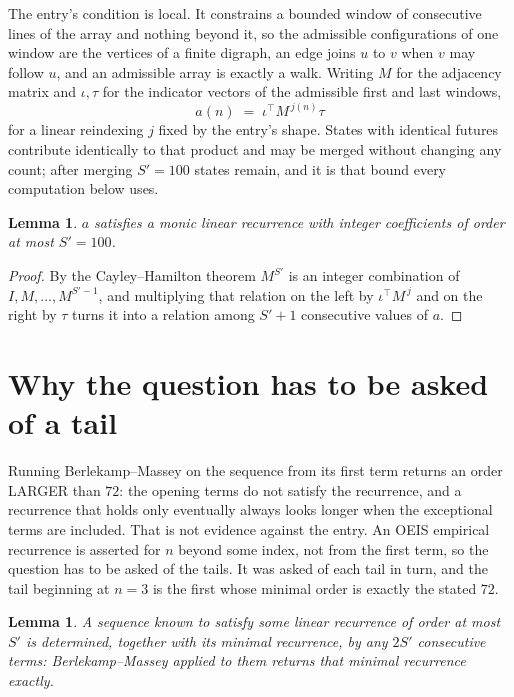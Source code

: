 \documentclass[11pt,a4paper]{article}
\theoremstyle{plain}
\newtheorem{lemma}[theorem]{Lemma}
\theoremstyle{definition}
\begin{document}
The entry's condition is local. It constrains a bounded window of consecutive lines of the
array and nothing beyond it, so the admissible configurations of one window are the vertices of
a finite digraph, an edge joins $u$ to $v$ when $v$ may follow $u$, and an admissible array is
exactly a walk. Writing $M$ for the adjacency matrix and $\iota,\tau$ for the indicator vectors
of the admissible first and last windows,
\[
a(n)\;=\;\iota^{\!\top}M^{\,j(n)}\tau
\]
for a linear reindexing $j$ fixed by the entry's shape. States with identical futures
contribute identically to that product and may be merged without changing any count; after
merging $S'=100$ states remain, and it is that bound every computation below uses.

\begin{lemma}\label{lem:cf}
$a$ satisfies a monic linear recurrence with integer coefficients of order at most $S'=100$.
\end{lemma}

\begin{proof}
By the Cayley--Hamilton theorem $M^{S'}$ is an integer combination of $I,M,\dots,M^{S'-1}$,
and multiplying that relation on the left by $\iota^{\!\top}M^{\,j}$ and on the right by
$\tau$ turns it into a relation among $S'+1$ consecutive values of $a$.
\end{proof}

\section{Why the question has to be asked of a tail}

Running Berlekamp--Massey on the sequence from its first term returns an order LARGER than $72$: the opening terms do not satisfy the recurrence, and a recurrence that holds only eventually always looks longer when the exceptional terms are included. That is not evidence against the entry. An OEIS empirical recurrence is asserted for $n$ beyond some index, not from the first term, so the question has to be asked of the tails. It was asked of each tail in turn, and the tail beginning at $n=3$ is the first whose minimal order is exactly the stated $72$.

\begin{lemma}\label{lem:bm}
A sequence known to satisfy some linear recurrence of order at most $S'$ is determined,
together with its minimal recurrence, by any $2S'$ consecutive terms: Berlekamp--Massey applied
to them returns that minimal recurrence exactly.
\end{lemma}
\end{document}
